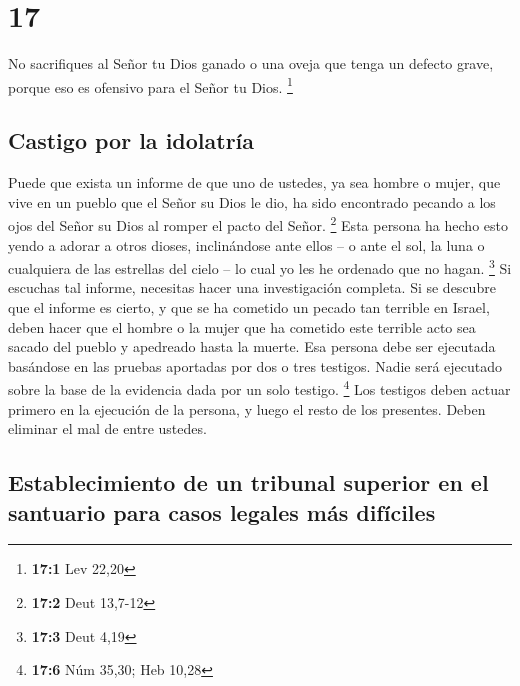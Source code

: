 \hypertarget{section-16}{%
\section{17}\label{section-16}}

 No sacrifiques al Señor tu Dios ganado o una oveja que
tenga un defecto grave, porque eso es ofensivo para el Señor tu Dios.
\footnote{\textbf{17:1} Lev 22,20}

\hypertarget{castigo-por-la-idolatruxeda}{%
\subsection{Castigo por la
idolatría}\label{castigo-por-la-idolatruxeda}}

 Puede que exista un informe de que uno de ustedes, ya sea
hombre o mujer, que vive en un pueblo que el Señor su Dios le dio, ha
sido encontrado pecando a los ojos del Señor su Dios al romper el pacto
del Señor. \footnote{\textbf{17:2} Deut 13,7-12}  Esta
persona ha hecho esto yendo a adorar a otros dioses, inclinándose ante
ellos -- o ante el sol, la luna o cualquiera de las estrellas del cielo
-- lo cual yo les he ordenado que no hagan. \footnote{\textbf{17:3} Deut
  4,19}  Si escuchas tal informe, necesitas hacer una
investigación completa. Si se descubre que el informe es cierto, y que
se ha cometido un pecado tan terrible en Israel,  deben
hacer que el hombre o la mujer que ha cometido este terrible acto sea
sacado del pueblo y apedreado hasta la muerte.  Esa
persona debe ser ejecutada basándose en las pruebas aportadas por dos o
tres testigos. Nadie será ejecutado sobre la base de la evidencia dada
por un solo testigo. \footnote{\textbf{17:6} Núm 35,30; Heb 10,28}
 Los testigos deben actuar primero en la ejecución de la
persona, y luego el resto de los presentes. Deben eliminar el mal de
entre ustedes.

\hypertarget{establecimiento-de-un-tribunal-superior-en-el-santuario-para-casos-legales-muxe1s-difuxedciles}{%
\subsection{Establecimiento de un tribunal superior en el santuario para
casos legales más
difíciles}\label{establecimiento-de-un-tribunal-superior-en-el-santuario-para-casos-legales-muxe1s-difuxedciles}}

